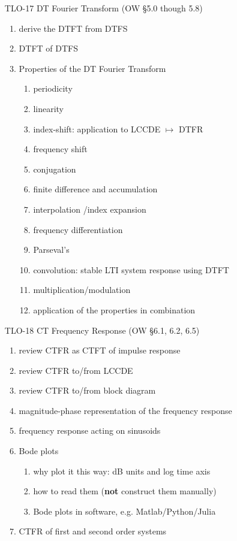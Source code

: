 \begin{enumerate}
\item[TLO-17] DT Fourier Transform (OW \S 5.0 though 5.8)
  \begin{enumerate}
  \item derive the DTFT from DTFS
  \item DTFT of DTFS
  \item Properties of the DT Fourier Transform
    \begin{enumerate}
    \item periodicity
    \item linearity
    \item index-shift: application to LCCDE $\mapsto$ DTFR
    \item frequency shift
    \item conjugation
    \item finite difference and accumulation
    \item interpolation /index expansion
    \item frequency differentiation
    \item Parseval's
    \item convolution: stable LTI system response using DTFT
    \item multiplication/modulation
    \item application of the properties in combination
    \end{enumerate}
  \end{enumerate}

\item[TLO-18] CT Frequency Response (OW \S 6.1, 6.2, 6.5)
  \begin{enumerate}
  \item review CTFR as CTFT of impulse response
  \item review CTFR to/from LCCDE
  \item review CTFR to/from block diagram 
  \item magnitude-phase representation of the frequency response
  \item frequency response acting on sinusoids
  \item Bode plots
    \begin{enumerate}
    \item why plot it this way: dB units and log time axis
    \item how to read them (\textbf{not} construct them manually)
    \item Bode plots in software, e.g. Matlab/Python/Julia
    \end{enumerate}
  \item CTFR of first and second order systems
  \end{enumerate}


\end{enumerate}
